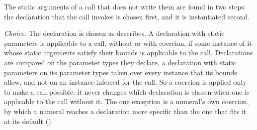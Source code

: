 The static arguments of a call that does not write them are found in two
steps: the declaration that the call invokes is chosen first, and it is
instantiated second.

\emph{Choice.}
The declaration is chosen as  describes.
A declaration with static parameters is applicable to a call, without or with
coercion, if some instance of it whose static arguments satisfy their bounds is
applicable to the call.
Declarations are compared on the parameter types they declare, a declaration
with static parameters on its parameter types taken over every instance that
its bounds allow, and not on an instance inferred for the call.
So a coercion is applied only to make a call possible: it never changes which
declaration is chosen when one is applicable to the call without it.
The one exception is a numeral's own coercion, by which a numeral reaches a
declaration more specific than the one that fits it at its default
().

